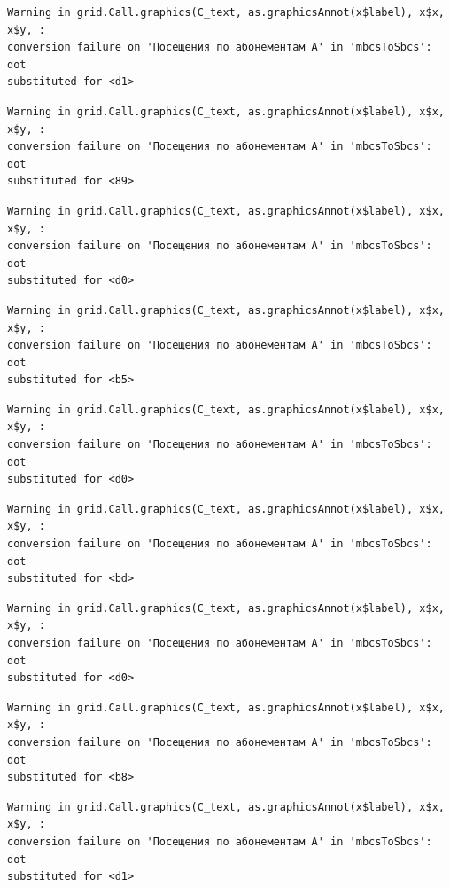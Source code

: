 \documentclass[
  letterpaper,
  DIV=11,
  numbers=noendperiod]{scrartcl}
\begin{document}
\begin{verbatim}
Warning in grid.Call.graphics(C_text, as.graphicsAnnot(x$label), x$x, x$y, :
conversion failure on 'Посещения по абонементам А' in 'mbcsToSbcs': dot
substituted for <d1>
\end{verbatim}

\begin{verbatim}
Warning in grid.Call.graphics(C_text, as.graphicsAnnot(x$label), x$x, x$y, :
conversion failure on 'Посещения по абонементам А' in 'mbcsToSbcs': dot
substituted for <89>
\end{verbatim}

\begin{verbatim}
Warning in grid.Call.graphics(C_text, as.graphicsAnnot(x$label), x$x, x$y, :
conversion failure on 'Посещения по абонементам А' in 'mbcsToSbcs': dot
substituted for <d0>
\end{verbatim}

\begin{verbatim}
Warning in grid.Call.graphics(C_text, as.graphicsAnnot(x$label), x$x, x$y, :
conversion failure on 'Посещения по абонементам А' in 'mbcsToSbcs': dot
substituted for <b5>
\end{verbatim}

\begin{verbatim}
Warning in grid.Call.graphics(C_text, as.graphicsAnnot(x$label), x$x, x$y, :
conversion failure on 'Посещения по абонементам А' in 'mbcsToSbcs': dot
substituted for <d0>
\end{verbatim}

\begin{verbatim}
Warning in grid.Call.graphics(C_text, as.graphicsAnnot(x$label), x$x, x$y, :
conversion failure on 'Посещения по абонементам А' in 'mbcsToSbcs': dot
substituted for <bd>
\end{verbatim}

\begin{verbatim}
Warning in grid.Call.graphics(C_text, as.graphicsAnnot(x$label), x$x, x$y, :
conversion failure on 'Посещения по абонементам А' in 'mbcsToSbcs': dot
substituted for <d0>
\end{verbatim}

\begin{verbatim}
Warning in grid.Call.graphics(C_text, as.graphicsAnnot(x$label), x$x, x$y, :
conversion failure on 'Посещения по абонементам А' in 'mbcsToSbcs': dot
substituted for <b8>
\end{verbatim}

\begin{verbatim}
Warning in grid.Call.graphics(C_text, as.graphicsAnnot(x$label), x$x, x$y, :
conversion failure on 'Посещения по абонементам А' in 'mbcsToSbcs': dot
substituted for <d1>
\end{verbatim}
\end{document}
